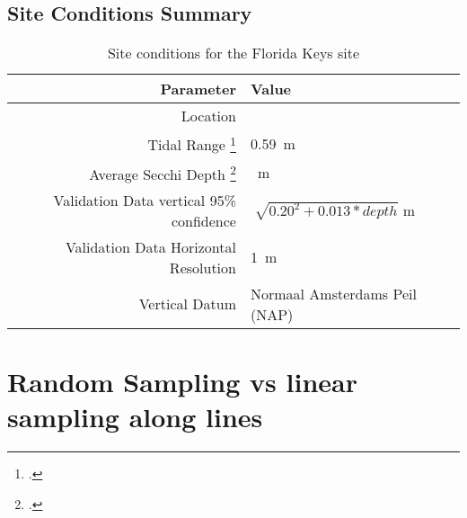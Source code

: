\subsection{Site Conditions Summary}
\begin{table}[htbp]
    \begin{minipage}{0.5\textwidth}
        \centering\begin{tabular}{r l }
            Parameter                                                 & \textbf{Value}                              \\
            \hline
            Location                                                  &                                             \\
            Tidal Range \footcite{tidal_data_reanalysis2022}          & \qty{0.59}{m}                               \\
            Average Secchi Depth \footcite{ACRI-STGlobColourTeam2020} & \qty{}{m}                                   \\
            Validation Data vertical 95\% confidence                  &  $\sqrt[]{0.20^2 + 0.013 * depth}$ m \\
            Validation Data Horizontal Resolution                     & \qty{1}{m}                                  \\
            Vertical Datum                                            & Normaal Amsterdams Peil (NAP)               \\
        \end{tabular}
    \end{minipage}
    \caption{Site conditions for the Florida Keys site}
    \label{table:Oahusitestats}
\end{table}

\section{Random Sampling vs linear sampling along lines}